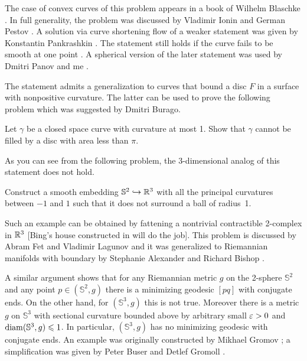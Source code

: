 The case of convex curves of this problem appears in a book of Wilhelm Blaschke \cite[see \S 24 in][]{blaschke}.
In full generality, the problem was discussed by Vladimir Ionin and German Pestov \cite{pestov-ionin}. %
A solution via curve shortening flow of a weaker statement 
was given by Konstantin Pankrashkin \cite{pankrashkin}.
The statement still holds if the curve fails to be smooth at one point \cite{petrunin-zamora:moon}.
A spherical version of the later statement 
was used by Dmitri Panov and me \cite{panov-petrunin-ramification}.

The statement admits a generalization to curves that bound a disc $F$ in a surface with nonpositive curvature.
The latter can be used to prove the following problem which was suggested by Dmitri Burago.

\begin{pr}
Let $\gamma$ be a closed space curve with curvature at most 1.
Show that $\gamma$ cannot be filled by a disc with area less than $\pi$.
\end{pr}


As you can see from the following problem, the 3-dimensional analog of this statement does not hold.

\begin{pr}
Construct a smooth embedding $\mathbb{S}^2\hookrightarrow \mathbb{R}^3$ 
with all the principal curvatures between $-1$ and $1$
such that it does not surround a ball of radius~1.
\end{pr}

Such an example can be obtained by fattening a nontrivial contractible 2-complex in $\mathbb{R}^3$ 
[Bing's house constructed in  will do the job].
This problem is discussed by Abram Fet and Vladimir Lagunov \cite{lagunov-2,lagunov-fet} 
and it was generalized to Riemannian manifolds with boundary by Stephanie Alexander and Richard Bishop \cite{alexander-bishop}.

A similar argument shows that for any Riemannian metric $g$ on the 2-sphere $\mathbb S^2$ 
and any point $p\in(\mathbb S^2,g)$ there is a minimizing geodesic $[pq]$ with conjugate ends.
On the other hand, for $(\mathbb S^3,g)$ this is not true.
Moreover there is a metric $g$ on $\mathbb{S}^3$ 
with sectional curvature bounded above by arbitrary small $\varepsilon>0$ and $\operatorname{\rm diam}\nolimits(\mathbb{S}^3,g)\leqslant 1$.
In particular, $(\mathbb S^3,g)$ has no minimizing geodesic with conjugate ends.
An example was originally constructed by Mikhael Gromov \cite{gromov-almost-flat}; 
a simplification was given by 
Peter Buser
and Detlef Gromoll \cite{buser-gromoll}.

